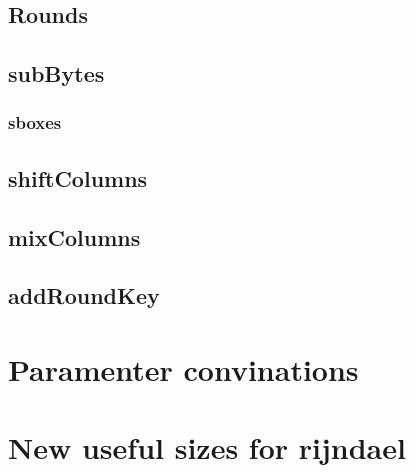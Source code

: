 \documentclass[a4paper,twoside]{llncs}
\begin{document}
 \subsection{Rounds}
 \subsection{subBytes}
 \subsubsection{sboxes}
 \subsection{shiftColumns}
 \subsection{mixColumns}
 \subsection{addRoundKey}
 \section{Paramenter convinations}
 \section{New useful sizes for rijndael}

\end{document}
